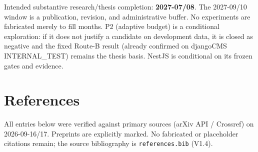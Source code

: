 \documentclass[11pt,a4paper]{article}
\begin{document}
Intended substantive research/thesis completion: \textbf{2027-07/08}. The
2027-09/10 window is a publication, revision, and administrative buffer. No
experiments are fabricated merely to fill months. P2 (adaptive budget) is a
conditional exploration: if it does not justify a candidate on development
data, it is closed as negative and the fixed Route-B result (already confirmed
on djangoCMS INTERNAL\_TEST) remains the thesis basis. NestJS is conditional on
its frozen gates and evidence.

\section{References}
\label{sec:refs}

All entries below were verified against primary sources (arXiv API /
Crossref) on 2026-09-16/17. Preprints are explicitly marked. No fabricated or
placeholder citations remain; the source bibliography is
\texttt{references.bib} (V1.4).



\end{document}
